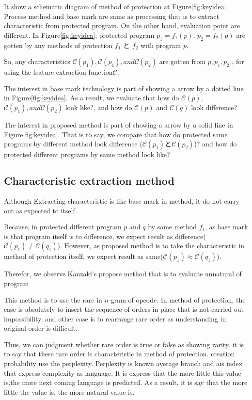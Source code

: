 \documentclass[conference]{IEEEtran}
\newcommand{\birth}[1]{\mathcal{C}(#1)}
\begin{document}
It show a schematic diagram of method of protection at
Figure\ref{fig:keyidea}.  Process method and base mark are same as
processing that is to extract characteristic from protected program.
On the other hand, evaluation point are different.
In Figure\ref{fig:keyidea}, protected program $p_1=f_1(p)$,
$p_2=f_2(p)$ are gotten by any methods of protection $f_1$ と $f_2$
with program $p$.

So, any characteristics $\birth{p_1}, \birth{p_1}, and \birth{p_2}$
are gotten from $p, p_1, p_2$ , for using the feature extraction
function$\mathcal{C}$.

The interest in base mark technology is part of showing a arrow by a
dotted line in Figure\ref{fig:keyidea}.  As a result, we evaluate that
how do $\birth{p}$, $\birth{p_1}, and \birth{p_2}$ look like?, and how
do $\birth{p}$ and $\birth{q}$ look difference?


The interest in proposed method is part of showing a arrow by a solid
line in Figure\ref{fig:keyidea}.  That is to say, we compare that how
do protected same programs by different method look difference
($\birth{p_1}$と$\birth{p_2}$)? and how do protected different
programs by same method look like?


\subsection{Characteristic extraction method}

Although Extracting characteristic is like base mark in method, it do
not carry out as expected to itself.

Because, in protected different program $p$ and $q$ by same method
$f_1$, as base mark is that program itself is to difference, we expect
result as difference($\birth{p_1} \neq\birth{q_1}$).  However, as
proposed method is to take the characteristic in method of protection
itself, we expect result as same($\birth{p_1} \approx \birth{q_1}$).

Therefor, we observe Kanzaki's propose method that is to evaluate
unnatural of program\cite{kanzaki14ipsj}

This method is to use the rare in $n$-gram of opcode.  In method of
protection, the case is absolutely to insert the sequence of orders in
place that is not carried out impossibility, and other case is to
rearrange rare order as understanding in original order is difficult.

Thus, we can judgment whether rare order is true or false as showing
rarity.  it is to say that these rare order is characteristic in
method of protection.  creation probability use the
perplexity\cite{gekka14scis}.  Perplexity is known average branch and
ais index that express complexity as language.  It is express that the
more little this value is,the more next coming language is predicted.
As a result, it is say that the more little the value is, the more
natural value is.
\end{document}
